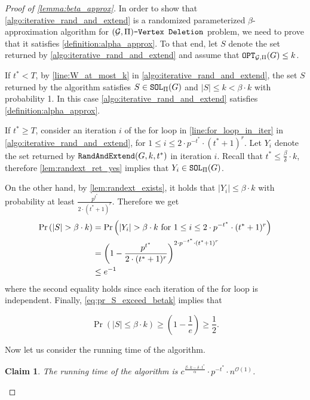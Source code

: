 \documentclass[letterpaper,11pt]{article}
\newcommand{\abs}[1]{{\left| #1\right|}}
\newcommand{\1}[1]{\mathds{1}\left[#1\right]}
\newcommand{\sat}{\textnormal{\texttt{SOL}}}
\newcommand{\randext}{\textnormal{\texttt{RandAndExtend}}}
\newcommand{\OPT}{\textnormal{\texttt{OPT}}}
\newcommand{\Oh}{\mathcal{O}}
\newtheorem{claim}[theorem]{Claim}
\newcommand{\gpivd}[1][\mathcal{G},\Pi]{(#1)\textnormal{\texttt{-Vertex Deletion}}}
\newcommand{\cG}{\mathcal{G}}
\begin{document}
\begin{proof}[Proof of \cref{lemma:beta_approx}]
	In order to show that \cref{algo:iterative_rand_and_extend} is a
	randomized parameterized $\beta$-approximation algorithm for $\gpivd$
	problem, we need to prove that it satisfies
	\cref{definition:alpha_approx}.
	To that end, let $S$ denote the set returned by \cref{algo:iterative_rand_and_extend}
	and assume that $\OPT_{\cG,\Pi}(G) \leq k$.
	
	If $t^* < T$, by \cref{line:W_at_most_k} in \cref{algo:iterative_rand_and_extend},
	the set $S$ returned by the algorithm
	satisfies $S \in \sat_{\Pi}(G)$ and $\abs{S} \leq k < \beta \cdot k$ with probability 1.
	In this case \cref{algo:iterative_rand_and_extend} satisfies \cref{definition:alpha_approx}.
	
	If $t^* \geq T$, consider an iteration $i$ of the for loop in \cref{line:for_loop_in_iter}
	in \cref{algo:iterative_rand_and_extend}, for $1 \leq i \leq 2 \cdot p^{-t^*} \cdot (t^* + 1)^r$.
	Let $Y_i$ denote the set returned by $\randext(G, k, t^*)$ in iteration $i$.
	Recall that $t^* \leq \frac{\beta}{\delta} \cdot k$, therefore
	\cref{lem:randext_ret_yes} implies that $Y_i \in \sat_{\Pi}(G)$.

	On the other hand, by \cref{lem:randext_exists}, 
	it holds that 
	$\abs{Y_i} \leq \beta \cdot k$ with probability at least
	$\frac{p^{t^*}}{2 \cdot (t^* + 1)^{r}}$. Therefore we get
	\begin{align}
		\Pr\left(\abs{S} > \beta \cdot k\right) &= \Pr\left( \abs{Y_i} > \beta \cdot k \text{ for } 1 \leq i \leq 2 \cdot p^{-t^*} \cdot (t^* + 1)^r \right) \notag \\
									 &= \left( 1 - \frac{p^{t^*}}{2 \cdot (t^* + 1)^{r}} \right) ^{2 \cdot p^{-t^*} \cdot (t^* + 1)^{r}} \notag \\
									 &\leq e^{-1} \label{eq:pr_S_exceed_betak}
	\end{align}
	where the second equality holds since each iteration of the for loop is independent.
	Finally, \eqref{eq:pr_S_exceed_betak} implies that

	\begin{equation*}
		\Pr\left( \abs{S} \leq \beta \cdot k \right) \geq \left(1 - \frac{1}{e}\right) \geq \frac{1}{2}.
	\end{equation*}

	Now let us consider the running time of the algorithm.

	\begin{claim}\label{claim:running_time_iter_randandextend}
		The running time of the algorithm is $c^{\frac{\beta \cdot k - \delta \cdot t^*}{\alpha}} \cdot p^{-t^*}  \cdot n^{\Oh(1)}$.
	\end{claim}


\end{proof}
\end{document}
